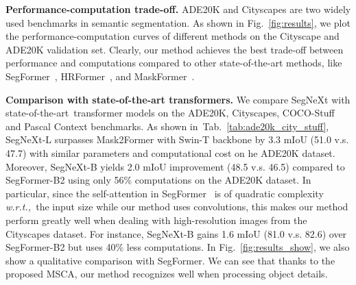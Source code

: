 \documentclass{article}
\def\wrt{\emph{w.r.t.,~}}
\def\sArt{state-of-the-art~}
\newcommand{\figref}[1]{Fig.~\ref{#1}}
\newcommand{\tabref}[1]{Tab.~\ref{#1}}
\begin{document}
\textbf{Performance-computation trade-off.}
ADE20K and Cityscapes are two widely used benchmarks in semantic segmentation.
As shown in \figref{fig:results}, we plot the performance-computation curves of
different methods on the Cityscape and ADE20K validation set. 
Clearly, our method achieves the best trade-off between performance and computations
compared to other state-of-the-art methods, like SegFormer~\cite{xie2021segformer}, HRFormer~\cite{yuan2021hrformer}, and MaskFormer~\cite{cheng2021maskformer}.


\textbf{Comparison with state-of-the-art transformers.}
We compare SegNeXt with \sArt transformer models on the ADE20K, Cityscapes, COCO-Stuff and Pascal Context benchmarks.
As shown in~\tabref{tab:ade20k_city_stuff}, SegNeXt-L surpasses Mask2Former 
with Swin-T backbone by 3.3 mIoU (51.0 v.s. 47.7) with similar parameters and 
computational cost on he ADE20K dataset.
Moreover, SegNeXt-B yields 2.0 mIoU improvement (48.5 v.s. 46.5) compared to SegFormer-B2 
using only 56\% computations on the ADE20K dataset.
In particular, since the self-attention in SegFormer~\cite{xie2021segformer} is of quadratic complexity \wrt the input size while our method uses convolutions, this makes our method perform
greatly well when dealing with high-resolution images from the Cityscapes dataset.
For instance,  SegNeXt-B gains 1.6 mIoU (81.0 v.s. 82.6) over SegFormer-B2 
but uses 40\% less computations.
In \figref{fig:results_show}, we also show a qualitative comparison with SegFormer.
We can see that thanks to the proposed MSCA, our method recognizes well 
when processing object details.
\end{document}

